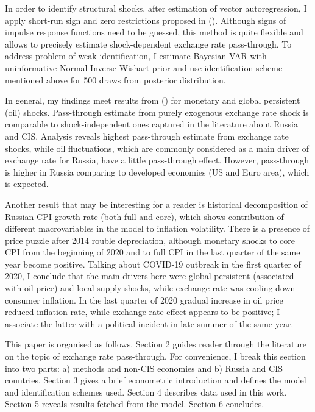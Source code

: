 \documentclass[12pt, a4paper]{extarticle}
\begin{document}
In order to identify structural shocks, after estimation of vector autoregression, I apply short-run sign and zero restrictions proposed in (\cite{Arias2014}). Although signs of impulse response functions need to be guessed, this method is quite flexible and allows to precisely estimate shock-dependent exchange rate pass-through. To address problem of weak identification, I estimate Bayesian VAR with uninformative Normal Inverse-Wishart prior and use identification scheme mentioned above for 500 draws from posterior distribution. 

In general, my findings meet results from (\cite{Khotulev2020}) for monetary and global persistent (oil) shocks. Pass-through estimate from purely exogenous exchange rate shock is comparable to shock-independent ones captured in the literature about Russia and CIS. Analysis reveals highest pass-through estimate from exchange rate shocks, while oil fluctuations, which are commonly considered as a main driver of exchange rate for Russia, have a little pass-through effect. However, pass-through is higher in Russia comparing to developed economies (US and Euro area), which is expected.

Another result that may be interesting for a reader is historical decomposition of Russian CPI growth rate (both full and core), which shows contribution of different macrovariables in the model to inflation volatility. There is a presence of price puzzle after 2014 rouble depreciation, although monetary shocks to core CPI from the beginning of 2020 and to full CPI in the last quarter of the same year become positive. Talking about COVID-19 outbreak in the first quarter of 2020, I conclude that the main drivers here were global persistent (associated with oil price) and local supply shocks, while exchange rate was cooling down consumer inflation. In the last quarter of 2020 gradual increase in oil price reduced inflation rate, while exchange rate effect appears to be positive; I associate the latter with a political incident in late summer of the same year.

This paper is organised as follows. Section 2 guides reader through the literature on the topic of exchange rate pass-through. For convenience, I break this section into two parts: a) methods and non-CIS economies and b) Russia and CIS countries. Section 3 gives a brief econometric introduction and defines the model and identification schemes used. Section 4 describes data used in this work. Section 5 reveals results fetched from the model. Section 6 concludes.
\end{document}
